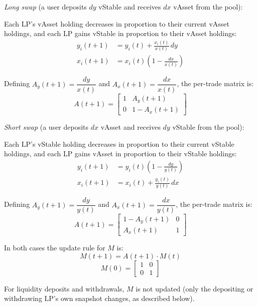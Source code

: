 \documentclass{article}
\begin{document}
\medskip
\noindent\textit{Long swap} (a user deposits $dy$ vStable and receives $dx$ vAsset from
the pool):

Each LP's vAsset holding decreases in proportion to their current vAsset holdings, and each
LP gains vStable in proportion to their vAsset holdings:
\begin{align}
y_i(t+1) &= y_i(t) + \frac{x_i(t)}{x(t)}\, dy \\
x_i(t+1) &= x_i(t)\!\left(1 - \frac{dx}{x(t)}\right)
\end{align}

Defining $A_y(t+1) = \dfrac{dy}{x(t)}$ and $A_x(t+1) = \dfrac{dx}{x(t)}$, the per-trade
matrix is:
\begin{equation}
A(t+1) = \begin{bmatrix} 1 & A_y(t+1) \\ 0 & 1 - A_x(t+1) \end{bmatrix}
\end{equation}

\medskip
\noindent\textit{Short swap} (a user deposits $dx$ vAsset and receives $dy$ vStable from
the pool):

Each LP's vStable holding decreases in proportion to their current vStable holdings, and
each LP gains vAsset in proportion to their vStable holdings:
\begin{align}
y_i(t+1) &= y_i(t)\!\left(1 - \frac{dy}{y(t)}\right) \\
x_i(t+1) &= x_i(t) + \frac{y_i(t)}{y(t)}\, dx
\end{align}

Defining $A_y(t+1) = \dfrac{dy}{y(t)}$ and $A_x(t+1) = \dfrac{dx}{y(t)}$, the per-trade
matrix is:
\begin{equation}
A(t+1) = \begin{bmatrix} 1 - A_y(t+1) & 0 \\ A_x(t+1) & 1 \end{bmatrix}
\end{equation}

\medskip
In both cases the update rule for $M$ is:
\begin{equation}
M(t+1) = A(t+1) \cdot M(t)
\end{equation}
\begin{equation}
M(0) = \begin{bmatrix} 1 & 0 \\ 0 & 1 \end{bmatrix}
\end{equation}

For liquidity deposits and withdrawals, $M$ is not updated (only the depositing or
withdrawing LP's own snapshot changes, as described below).
\end{document}

